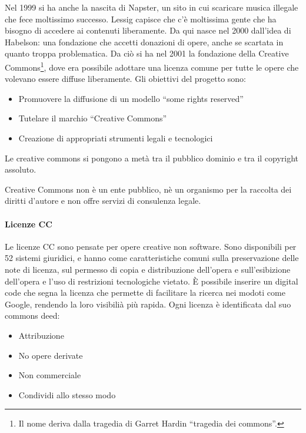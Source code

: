 Nel 1999 si ha anche la nascita di Napster, un sito in cui scaricare musica illegale che fece moltissimo successo. Lessig capisce che c'\`e moltissima gente che ha bisogno di accedere ai contenuti liberamente. Da qui nasce nel 2000 dall'idea di Habelson: una fondazione che accetti donazioni di opere, anche se scartata in quanto troppa problematica. Da ci\`o si ha nel 2001 la fondazione della Creative Commons\footnote{Il nome deriva dalla tragedia di Garret Hardin ``tragedia dei commons''.}, dove era possibile adottare una licenza comune per tutte le opere che volevano essere diffuse liberamente. Gli obiettivi del progetto sono:
\begin{itemize}

\item Promuovere la diffusione di un modello ``some rights reserved''
\item Tutelare il marchio ``Creative Commons''
\item Creazione di  appropriati strumenti legali e tecnologici

\end{itemize}
Le creative commons si pongono a met\`a tra il pubblico dominio e tra il copyright assoluto.

Creative Commons non \`e un ente pubblico, n\`e un organismo per la raccolta dei diritti d'autore e non offre servizi di consulenza legale.

\paragraph*{Licenze CC}Le licenze CC sono pensate per opere creative non software. Sono disponibili per 52 sistemi giuridici, e hanno come caratteristiche comuni sulla preservazione delle note di licenza, sul permesso di copia e distribuzione dell'opera e sull'esibizione dell'opera e l'uso di restrizioni tecnologiche vietato.
\`E possibile inserire un digital code che segna la licenza che permette di facilitare la ricerca nei modoti come Google, rendendo la loro visibili\`a pi\`u rapida. Ogni licenza \`e identificata dal suo commons deed:
\begin{itemize}
  
\item Attribuzione
\item No opere derivate
\item Non commerciale
\item Condividi allo stesso modo

\end{itemize}

